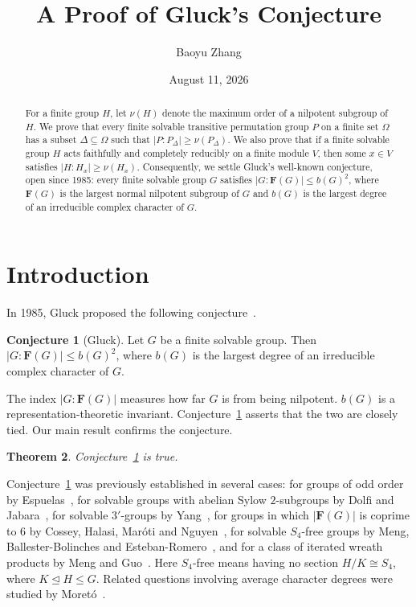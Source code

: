 \documentclass[10pt]{amsart}
\title{A Proof of Gluck's Conjecture}
\author{Baoyu Zhang}
\date{August 11, 2026}
\newtheorem{theorem}{Theorem}[section]
\theoremstyle{definition}
\newtheorem{conjecture}[theorem]{Conjecture}
\renewcommand{\le}{\leqslant}
\renewcommand{\ge}{\geqslant}
\renewcommand{\leq}{\leqslant}
\numberwithin{equation}{section}
\numberwithin{table}{section}
\begin{document}

\begin{abstract}
For a finite group $H$, let $\nu(H)$ denote the maximum order of a nilpotent
subgroup of $H$. We prove that every finite solvable transitive permutation
group $P$ on a finite set $\Omega$ has a subset $\Delta\subseteq\Omega$ such
that $|P:P_\Delta|\ge\nu(P_\Delta)$. We also prove that if a finite solvable
group $H$ acts faithfully and completely reducibly on a finite module $V$,
then some $x\in V$ satisfies $|H:H_x|\ge\nu(H_x)$. Consequently, we settle
Gluck's well-known conjecture, open since 1985: every finite solvable group $G$
satisfies $|G:\mathbf{F}(G)|\le b(G)^2$, where $\mathbf{F}(G)$ is the largest
normal nilpotent subgroup of $G$ and $b(G)$ is the largest degree of an irreducible complex character of $G$.
\end{abstract}

\maketitle

\setcounter{tocdepth}{1}%


\section{Introduction}

In 1985, Gluck proposed the following conjecture~\cite{Glu85}.

\begin{conjecture}[Gluck]\label{conj:gluck}
Let $G$ be a finite solvable group. Then $|G:\mathbf{F}(G)|\le b(G)^2$, where $b(G)$ is the largest degree of an irreducible complex character of $G$.
\end{conjecture}

The index $|G:\mathbf{F}(G)|$ measures how far $G$ is from being nilpotent.
$b(G)$ is a representation-theoretic invariant.
Conjecture~\ref{conj:gluck} asserts
that the two are closely tied. Our main result confirms the conjecture.

\begin{theorem}\label{thm:gluck-holds}
Conjecture~\ref{conj:gluck} is true.
\end{theorem}

Conjecture~\ref{conj:gluck} was previously established in several cases:
for groups of odd order by Espuelas~\cite{Espuelas91}, for solvable groups with abelian Sylow $2$-subgroups by Dolfi and Jabara~\cite{DolfiJabara07}, for solvable $3'$-groups by Yang~\cite{Yang11a},
for groups in which $|\mathbf{F}(G)|$ is coprime to $6$ by Cossey,
Halasi, Mar\'oti and Nguyen~\cite{CHMN15}, for solvable $S_4$-free
groups by Meng, Ballester-Bolinches and Esteban-Romero~\cite{MengBBER19}, and for a class of iterated wreath products by Meng and Guo~\cite{MengGuo25}. Here $S_4$-free means having no section
$H/K\cong S_4$, where $K\trianglelefteq H\leq G$. Related questions
involving average character degrees were studied by
Moret\'o~\cite{Moreto23}.
\end{document}

